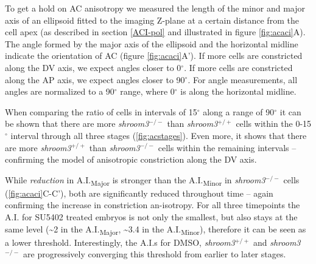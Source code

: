 \documentclass[11pt,singlespacinge,twoside]{reedthesis} %
\theoremstyle{definition}
\theoremstyle{definition}
\theoremstyle{definition}
\theoremstyle{remark}
\begin{document}
To get a hold on AC anisotropy we measured the length of the minor and major axis of an ellipsoid fitted to the imaging Z-plane at a certain distance from the cell apex (as described in section \ref{ACI-pol} and illustrated in figure \ref{fig:acaci}A). The angle formed by the major axis of the ellipsoid and the horizontal midline indicate the orientation of AC (figure \ref{fig:acaci}A'). If more cells are constricted along the DV axis, we expect angles closer to 0\(^\circ\). If more cells are constricted along the AP axis, we expect angles closer to 90\(^\circ\). For angle measurements, all angles are normalized to a 90\(^\circ\) range, where 0\(^\circ\) is along the horizontal midline.

When comparing the ratio of cells in intervals of 15\(^\circ\) along a range of 90\(^\circ\) it can be shown that there are more \emph{shroom3}\(^{-/-}\) than \emph{shroom3}\(^{+/+}\) cells within the 0-15\(^\circ\) interval through all three stages (\ref{fig:acstages}). Even more, it shows that there are more \emph{shroom3}\(^{+/+}\) than \emph{shroom3}\(^{-/-}\) cells within the remaining intervals -- confirming the model of anisotropic constriction along the DV axis.

While \emph{reduction} in A.I.\textsubscript{Major} is stronger than the A.I.\textsubscript{Minor} in \emph{shroom3}\(^{-/-}\) cells (\ref{fig:acaci}C-C'), both are significantly reduced throughout time -- again confirming the increase in constriction an-isotropy. For all three timepoints the A.I. for SU5402 treated embryos is not only the smallest, but also stays at the same level (\textasciitilde2 in the A.I.\textsubscript{Major}, \textasciitilde3.4 in the A.I.\textsubscript{Minor}), therefore it can be seen as a lower threshold. Interestingly, the A.I.s for DMSO, \emph{shroom3}\(^{+/+}\) and \emph{shroom3}\(^{-/-}\) are progressively converging this threshold from earlier to later stages.
\end{document}
